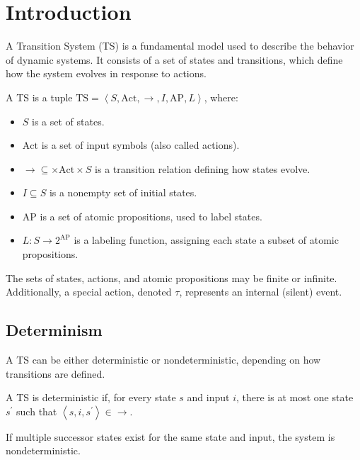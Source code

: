 \section{Introduction}

A Transition System (TS) is a fundamental model used to describe the behavior of dynamic systems. 
It consists of a set of states and transitions, which define how the system evolves in response to actions.
\begin{definition}
    A TS is a tuple $\text{TS}=\left\langle S, \text{Act}, \rightarrow, I,\text{AP}, L\right\rangle$, where:
    \begin{itemize}
        \item $S$ is a set of states.
        \item $\text{Act}$ is a set of input symbols (also called actions).
        \item $\rightarrow \subseteq \times \text{Act}\times S$ is a transition relation defining how states evolve.
        \item $I \subseteq S$ is a nonempty set of initial states.
        \item $\text{AP}$ is a set of atomic propositions, used to label states.
        \item $L: S \rightarrow 2^{\text{AP}}$ is a labeling function, assigning each state a subset of atomic propositions.
    \end{itemize}
\end{definition}
The sets of states, actions, and atomic propositions may be finite or infinite. 
Additionally, a special action, denoted $\tau$, represents an internal (silent) event.

\subsection{Determinism}
A TS can be either deterministic or nondeterministic, depending on how transitions are defined.
\begin{definition}
    A TS is deterministic if, for every state $s$ and input $i$, there is at most one state $s^\prime$ such that $\left\langle s, i, s^\prime\right\rangle \in\rightarrow$. 
\end{definition}
If multiple successor states exist for the same state and input, the system is nondeterministic.

